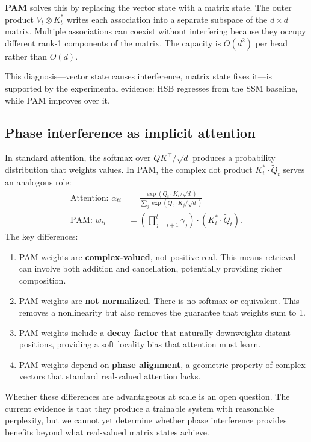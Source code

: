 \documentclass[11pt]{article}
\begin{document}
\textbf{PAM} solves this by replacing the vector state with a matrix state. The outer product $V_t \otimes K_t^*$ writes each association into a separate subspace of the $d \times d$ matrix. Multiple associations can coexist without interfering because they occupy different rank-1 components of the matrix. The capacity is $O(d^2)$ per head rather than $O(d)$.

This diagnosis---vector state causes interference, matrix state fixes it---is supported by the experimental evidence: HSB regresses from the SSM baseline, while PAM improves over it.

\subsection{Phase interference as implicit attention}
In standard attention, the softmax over $QK^\top / \sqrt{d}$ produces a probability distribution that weights values. In PAM, the complex dot product $K_i^* \cdot \tilde{Q}_t$ serves an analogous role:
\begin{align}
  \text{Attention: } \alpha_{ti} &= \frac{\exp(Q_t \cdot K_i / \sqrt{d})}{\sum_j \exp(Q_t \cdot K_j / \sqrt{d})} \\
  \text{PAM: } w_{ti} &= \left(\prod_{j=i+1}^{t} \gamma_j\right) \cdot (K_i^* \cdot \tilde{Q}_t) .
\end{align}
The key differences:
\begin{enumerate}
  \item PAM weights are \textbf{complex-valued}, not positive real. This means retrieval can involve both addition and cancellation, potentially providing richer composition.
  \item PAM weights are \textbf{not normalized}. There is no softmax or equivalent. This removes a nonlinearity but also removes the guarantee that weights sum to 1.
  \item PAM weights include a \textbf{decay factor} that naturally downweights distant positions, providing a soft locality bias that attention must learn.
  \item PAM weights depend on \textbf{phase alignment}, a geometric property of complex vectors that standard real-valued attention lacks.
\end{enumerate}
Whether these differences are advantageous at scale is an open question. The current evidence is that they produce a trainable system with reasonable perplexity, but we cannot yet determine whether phase interference provides benefits beyond what real-valued matrix states achieve.
\end{document}
